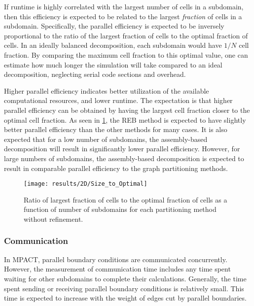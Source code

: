 {{{{        If runtime is highly correlated with the largest number of cells in a subdomain, then this efficiency is expected to be related to the largest \emph{fraction} of cells in a subdomain.
        Specifically, the parallel efficiency is expected to be inversely proportional to the ratio of the largest fraction of cells to the optimal fraction of cells.
        In an ideally balanced decomposition, each subdomain would have $1/N$ cell fraction.
        By comparing the maximum cell fraction to this optimal value, one can estimate how much longer the simulation will take compared to an ideal decomposition, neglecting serial code sections and overhead.

        Higher parallel efficiency indicates better utilization of the available computational resources, and lower runtime.
        The expectation is that higher parallel efficiency can be obtained by having the largest cell fraction closer to the optimal cell fraction.
        As seen in \cref{fig:Spatial Decomposition:Max/Optimal Ratio}, the \ac{REB} method is expected to have slightly better parallel efficiency than the other methods for many cases.
        It is also expected that for a low number of subdomains, the assembly-based decomposition will result in significantly lower parallel efficiency.
        However, for large numbers of subdomains, the assembly-based decomposition is expected to result in comparable parallel efficiency to the graph partitioning methods.

        \begin{figure}
          \centering
          \texttt{[image: results/2D/Size\_to\_Optimal]}
          \caption{Ratio of largest fraction of cells to the optimal fraction of cells as a function of number of subdomains for each partitioning method without refinement.\label{fig:Spatial Decomposition:Max/Optimal Ratio}}
        \end{figure}
      }
      \subsubsection{Communication}{\label{sssec:Communication}
        In MPACT, parallel boundary conditions are communicated concurrently.
        However, the measurement of communication time includes any time spent waiting for other subdomains to complete their calculations.
        Generally, the time spent sending or receiving parallel boundary conditions is relatively small.
        This time is expected to increase with the weight of edges cut by parallel boundaries.

}}}}
